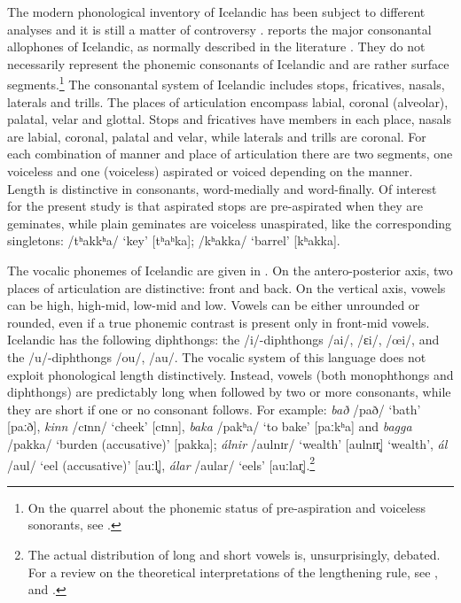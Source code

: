 \documentclass[11pt,a4paper,oneside,openany]{memoir}\usepackage[]{graphicx}\usepackage[]{color}
\begin{document}
The modern phonological inventory of Icelandic has been subject to different analyses and it is still a matter of controversy \citep{thraisson1978,jessen1998,arnason2011}.
 reports the major consonantal allophones of Icelandic, as normally described in the literature \citep[p. 98]{arnason2011}.
They do not necessarily represent the phonemic consonants of Icelandic and are rather surface segments.\footnote{
On the quarrel about the phonemic status of pre-aspiration and voiceless sonorants, see \citet{thraisson1978,jessen1998,berg2001,hansson2003,bombien2006}.
}
The consonantal system of Icelandic includes stops, fricatives, nasals, laterals and trills.
The places of articulation encompass labial, coronal (alveolar), palatal, velar and glottal.
Stops and fricatives have members in each place, nasals are labial, coronal, palatal and velar, while laterals and trills are coronal.
For each combination of manner and place of articulation there are two segments, one voiceless and one (voiceless) aspirated or voiced depending on the manner.
Length is distinctive in consonants, word-medially and word-finally.
Of interest for the present study is that aspirated stops are pre-aspirated when they are geminates, while plain geminates are voiceless unaspirated, like the corresponding singletons: /tʰakkʰa/ `key' [tʰaʰka]; /kʰakka/ `barrel' [kʰakka].

The vocalic phonemes of Icelandic are given in  \citep[p. 60]{arnason2011}.
On the antero-posterior axis, two places of articulation are distinctive: front and back.
On the vertical axis, vowels can be high, high-mid, low-mid and low.
Vowels can be either unrounded or rounded, even if a true phonemic contrast is present only in front-mid vowels.
Icelandic has the following diphthongs: the /i/-diphthongs /ai/, /ɛi/, /œi/, and the /u/-diphthongs /ou/, /au/.
The vocalic system of this language does not exploit phonological length distinctively.
Instead, vowels (both monophthongs and diphthongs) are predictably long when followed by two or more consonants, while they are short if one or no consonant follows.
For example: \textit{bað} /pað/ `bath' [paːð], \textit{kinn} /cɪnn/ `cheek' [cɪnn], \textit{baka} /pakʰa/  `to bake' [paːkʰa] and \textit{bagga} /pakka/ `burden (accusative)' [pakka]; \textit{álnir} /aulnɪr/ `wealth' [aulnɪr̥] ‘wealth’, \textit{ál} /aul/ `eel (accusative)' [auːl̥], \textit{álar} /aular/ `eels' [auːlar̥].\footnote{The actual distribution of long and short vowels is, unsurprisingly, debated.
For a review on the theoretical interpretations of the lengthening rule, see \citet{booij1986,pind1999}, and \citet[pp. 160--173, 203--208]{arnason2011}.
}
\end{document}
